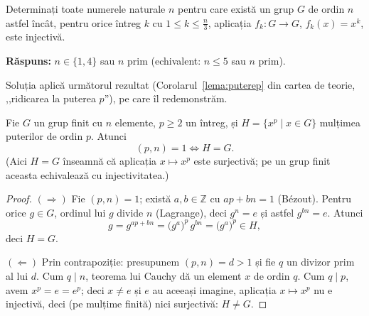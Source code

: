 \begin{problema}
Determinați toate numerele naturale $n$ pentru care există un grup
$G$ de ordin $n$ astfel încât, pentru orice întreg $k$ cu
$1\le k\le \tfrac{n}{3}$, aplicația $f_{k}:G\to G$, $f_{k}(x)=x^{k}$,
este injectivă.
\end{problema}

\noindent\textbf{Răspuns:} $n\in\{1,4\}$ sau $n$ prim (echivalent:
$n\le 5$ sau $n$ prim).

Soluția aplică următorul rezultat (Corolarul~\ref{lema:puterep} din cartea
de teorie, ,,ridicarea la puterea $p$''), pe care îl redemonstrăm.

\begin{lemat}
Fie $G$ un grup finit cu $n$ elemente, $p\ge 2$ un întreg, și
$H=\{x^{p}\mid x\in G\}$ mulțimea puterilor de ordin $p$. Atunci
\[
  (p,n)=1 \iff H=G.
\]
(Aici $H=G$ înseamnă că aplicația $x\mapsto x^{p}$ este
surjectivă; pe un grup finit aceasta echivalează cu injectivitatea.)
\end{lemat}

\begin{proof}
$(\Rightarrow)$ Fie $(p,n)=1$; există $a,b\in\mathbb{Z}$ cu $ap+bn=1$
(Bézout). Pentru orice $g\in G$, ordinul lui $g$ divide $n$ (Lagrange),
deci $g^{n}=e$ și astfel $g^{bn}=e$. Atunci
\[
  g=g^{ap+bn}=\bigl(g^{a}\bigr)^{p}\,g^{bn}=\bigl(g^{a}\bigr)^{p}\in H,
\]
deci $H=G$.

$(\Leftarrow)$ Prin contrapoziție: presupunem $(p,n)=d>1$ și fie $q$
un divizor prim al lui $d$. Cum $q\mid n$, teorema lui Cauchy dă un
element $x$ de ordin $q$. Cum $q\mid p$, avem $x^{p}=e=e^{p}$; deci
$x\neq e$ și $e$ au aceeași imagine, aplicația $x\mapsto x^{p}$
nu e injectivă, deci (pe mulțime finită) nici surjectivă:
$H\neq G$.
\end{proof}

